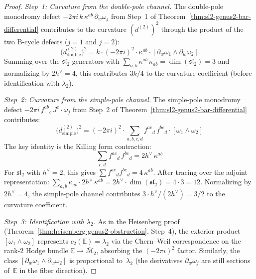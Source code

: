 \begin{proof}
\emph{Step~1: Curvature from the double-pole channel.}\enspace
The double-pole monodromy defect
$-2\pi i\, k\, \kappa^{ab}\, \partial_w\omega_j$
from Step~1 of
Theorem~\ref{thm:sl2-genus2-bar-differential}
contributes to the curvature $(d^{(2)})^2$ through the
product of the two B-cycle defects ($j = 1$ and $j = 2$):
\begin{equation}\label{eq:double-pole-curvature}
\bigl(d^{(2)}_{\mathrm{double}}\bigr)^2
= k \cdot (-2\pi i)^2 \cdot
  \kappa^{ab} \cdot [\partial_w\omega_1 \wedge \partial_w\omega_2]
\end{equation}
Summing over the $\mathfrak{sl}_2$ generators with
$\sum_{a,b} \kappa^{ab}\, \kappa_{ab} = \dim(\mathfrak{sl}_2) = 3$
and normalizing by $2h^\vee = 4$, this contributes
$3k/4$ to the curvature coefficient (before identification with
$\lambda_2$).

\emph{Step~2: Curvature from the simple-pole channel.}
The simple-pole monodromy defect
$-2\pi i\, f^{ab}{}_c\, J^c \cdot \omega_j$ from
Step~2 of Theorem~\ref{thm:sl2-genus2-bar-differential}
contributes:
\begin{equation}\label{eq:simple-pole-curvature}
\bigl(d^{(2)}_{\mathrm{simple}}\bigr)^2
= (-2\pi i)^2 \cdot
  \sum_{a,b,c,d} f^{ac}{}_d\, f^{bc}{}_d \cdot
  [\omega_1 \wedge \omega_2]
\end{equation}
The key identity is the Killing form contraction:
\begin{equation}\label{eq:killing-contraction}
\sum_{c,d} f^{ac}{}_d\, f^{bc}{}_d = 2h^\vee\, \kappa^{ab}
\end{equation}
For $\mathfrak{sl}_2$ with $h^\vee = 2$, this gives
$\sum f^{ac}{}_d f^{bc}{}_d = 4\,\kappa^{ab}$.
After tracing over the adjoint representation:
$\sum_{a,b} \kappa_{ab} \cdot 2h^\vee\, \kappa^{ab}
= 2h^\vee \cdot \dim(\mathfrak{sl}_2) = 4 \cdot 3 = 12$.
Normalizing by $2h^\vee = 4$, the simple-pole channel
contributes $3 \cdot h^\vee / (2h^\vee) = 3/2$ to the
curvature coefficient.

\emph{Step~3: Identification with $\lambda_2$.}
As in the Heisenberg proof
(Theorem~\ref{thm:heisenberg-genus2-obstruction}, Step~4),
the exterior product $[\omega_1 \wedge \omega_2]$ represents
$c_2(\mathbb{E}) = \lambda_2$ via the Chern--Weil correspondence
on the rank-$2$ Hodge bundle $\mathbb{E} \to
\overline{\mathcal{M}}_2$, absorbing the
$(-2\pi i)^2$ factor.  Similarly, the class
$[\partial_w\omega_1 \wedge \partial_w\omega_2]$ is proportional
to~$\lambda_2$ (the derivatives $\partial_w\omega_j$ are
still sections of~$\mathbb{E}$ in the fiber direction).


\end{proof}
